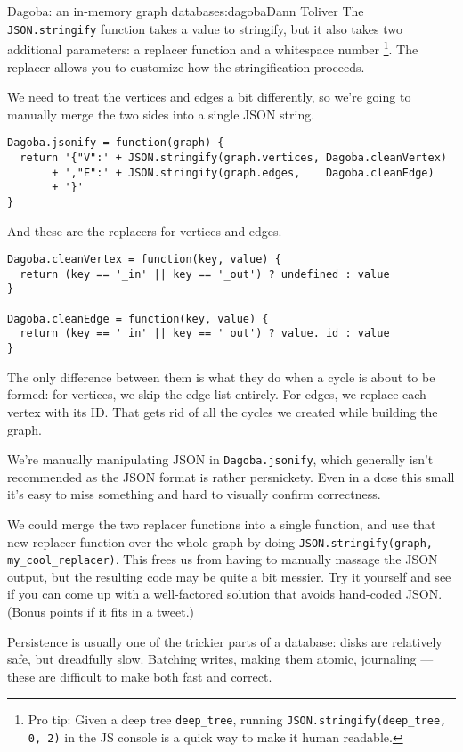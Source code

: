 \begin{aosachapter}{Dagoba: an in-memory graph database}{s:dagoba}{Dann Toliver}
The \texttt{JSON.stringify} function takes a value to stringify, but it
also takes two additional parameters: a replacer function and a
whitespace number \footnote{Pro tip: Given a deep tree
  \texttt{deep\_tree}, running \texttt{JSON.stringify(deep\_tree, 0, 2)}
  in the JS console is a quick way to make it human readable.}. The
replacer allows you to customize how the stringification proceeds.

We need to treat the vertices and edges a bit differently, so we're
going to manually merge the two sides into a single JSON string.

\begin{verbatim}
Dagoba.jsonify = function(graph) {
  return '{"V":' + JSON.stringify(graph.vertices, Dagoba.cleanVertex)
       + ',"E":' + JSON.stringify(graph.edges,    Dagoba.cleanEdge)
       + '}'
}
\end{verbatim}

And these are the replacers for vertices and edges.

\begin{verbatim}
Dagoba.cleanVertex = function(key, value) {
  return (key == '_in' || key == '_out') ? undefined : value
}

Dagoba.cleanEdge = function(key, value) {
  return (key == '_in' || key == '_out') ? value._id : value
}
\end{verbatim}

The only difference between them is what they do when a cycle is about
to be formed: for vertices, we skip the edge list entirely. For edges,
we replace each vertex with its ID. That gets rid of all the cycles we
created while building the graph.

We're manually manipulating JSON in \texttt{Dagoba.jsonify}, which
generally isn't recommended as the JSON format is rather persnickety.
Even in a dose this small it's easy to miss something and hard to
visually confirm correctness.

We could merge the two replacer functions into a single function, and
use that new replacer function over the whole graph by doing
\texttt{JSON.stringify(graph, my\_cool\_replacer)}. This frees us from
having to manually massage the JSON output, but the resulting code may
be quite a bit messier. Try it yourself and see if you can come up with
a well-factored solution that avoids hand-coded JSON. (Bonus points if
it fits in a tweet.)

\label{persistence}

Persistence is usually one of the trickier parts of a database: disks
are relatively safe, but dreadfully slow. Batching writes, making them
atomic, journaling --- these are difficult to make both fast and
correct.


\end{aosachapter}
